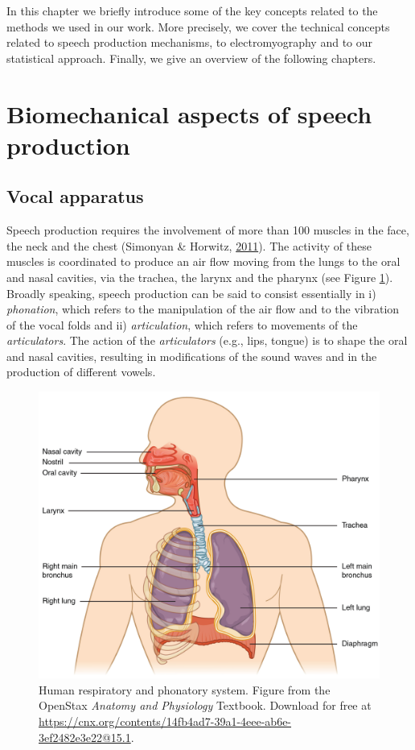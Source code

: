 \documentclass[a4paper,12pt,twoside,onecolumn,openright,final,oldfontcommands]{memoir}
\newcommand{\initial}[1]{
	\lettrine[lines=3,lhang=0.33,nindent=0em]{
		\color{gray}
     		{\textsc{#1}}}{}}
\begin{document}
\initial{I}n this chapter we briefly introduce some of the key concepts related to the methods we used in our work. More precisely, we cover the technical concepts related to speech production mechanisms, to electromyography and to our statistical approach. Finally, we give an overview of the following chapters.

\hypertarget{biomechanical-aspects-of-speech-production}{%
\section{Biomechanical aspects of speech production}\label{biomechanical-aspects-of-speech-production}}

\hypertarget{vocal-apparatus}{%
\subsection{Vocal apparatus}\label{vocal-apparatus}}

Speech production requires the involvement of more than 100 muscles in the face, the neck and the chest (Simonyan \& Horwitz, \protect\hyperlink{ref-simonyan_laryngeal_2011}{2011}). The activity of these muscles is coordinated to produce an air flow moving from the lungs to the oral and nasal cavities, via the trachea, the larynx and the pharynx (see Figure \ref{fig:vocal}). Broadly speaking, speech production can be said to consist essentially in i) \emph{phonation}, which refers to the manipulation of the air flow and to the vibration of the vocal folds and ii) \emph{articulation}, which refers to movements of the \emph{articulators}. The action of the \emph{articulators} (e.g., lips, tongue) is to shape the oral and nasal cavities, resulting in modifications of the sound waves and in the production of different vowels.

\begin{figure}[ht]

{\centering \includegraphics[width=0.5\linewidth]{assets/vocal} 

}

\caption{Human respiratory and phonatory system. Figure from the OpenStax \textit{Anatomy and Physiology} Textbook. Download for free at \url{https://cnx.org/contents/14fb4ad7-39a1-4eee-ab6e-3ef2482e3e22@15.1}.}\label{fig:vocal}
\end{figure}
\end{document}
